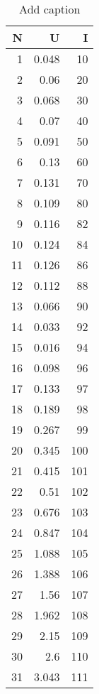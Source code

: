 \documentclass[10pt,a4paper]{article}
\begin{document}
\begin{flushleft}
\begin{table}[htbp]
  \centering
  \caption{Add caption}
    \begin{tabular}{rrr}
    \hline
    N     & U     & I \\
    \hline
    1     & 0.048 & 10 \\
    2     & 0.06  & 20 \\
    3     & 0.068 & 30 \\
    4     & 0.07  & 40 \\
    5     & 0.091 & 50 \\
    6     & 0.13  & 60 \\
    7     & 0.131 & 70 \\
    8     & 0.109 & 80 \\
    9     & 0.116 & 82 \\
    10    & 0.124 & 84 \\
    11    & 0.126 & 86 \\
    12    & 0.112 & 88 \\
    13    & 0.066 & 90 \\
    14    & 0.033 & 92 \\
    15    & 0.016 & 94 \\
    16    & 0.098 & 96 \\
    17    & 0.133 & 97 \\
    18    & 0.189 & 98 \\
    19    & 0.267 & 99 \\
    20    & 0.345 & 100 \\
    21    & 0.415 & 101 \\
    22    & 0.51  & 102 \\
    23    & 0.676 & 103 \\
    24    & 0.847 & 104 \\
    25    & 1.088 & 105 \\
    26    & 1.388 & 106 \\
    27    & 1.56  & 107 \\
    28    & 1.962 & 108 \\
    29    & 2.15  & 109 \\
    30    & 2.6   & 110 \\
    31    & 3.043 & 111 \\
    \hline
    \end{tabular}%
  \label{tab:addlabel}%
\end{table}%


\end{flushleft}
\end{document}
